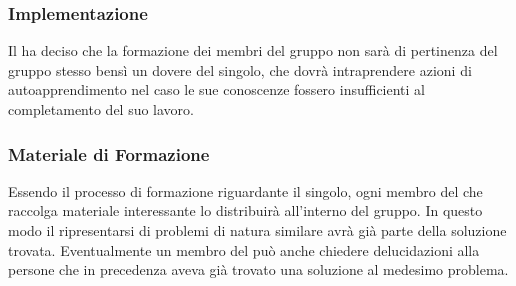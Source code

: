 \subsubsection{Implementazione}
Il  ha deciso che la formazione dei membri del gruppo non sarà di pertinenza del gruppo stesso bensì un dovere del singolo, che dovrà intraprendere azioni di autoapprendimento nel caso le sue conoscenze fossero insufficienti al completamento del suo lavoro.

\subsubsection{Materiale di Formazione}
Essendo il processo di formazione riguardante il singolo, ogni membro del  che raccolga materiale interessante lo distribuirà all'interno del gruppo. In questo modo il ripresentarsi di problemi di natura similare avrà già parte della soluzione trovata. Eventualmente un membro del  può anche chiedere delucidazioni alla persone che in precedenza aveva già trovato una soluzione al medesimo problema.


%
%
%
    

    
